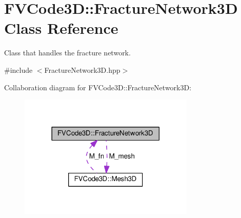 \hypertarget{classFVCode3D_1_1FractureNetwork3D}{}\section{F\+V\+Code3D\+:\+:Fracture\+Network3D Class Reference}
\label{classFVCode3D_1_1FractureNetwork3D}


Class that handles the fracture network.  




{\ttfamily \#include $<$Fracture\+Network3\+D.\+hpp$>$}



Collaboration diagram for F\+V\+Code3D\+:\+:Fracture\+Network3D\+:
\nopagebreak
\begin{figure}[H]
\begin{center}
\leavevmode
\includegraphics[width=237pt]{classFVCode3D_1_1FractureNetwork3D__coll__graph}
\end{center}
\end{figure}
